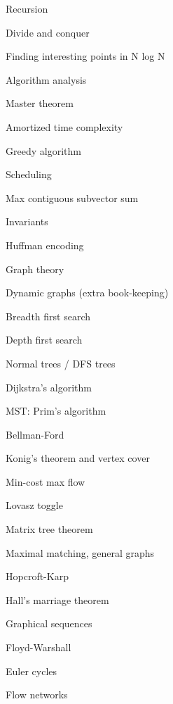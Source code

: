 \begin{myitemize}
\item Recursion
\item Divide and conquer
\begin{myitemize}
	\item Finding interesting points in N log N
\end{myitemize}
\item Algorithm analysis
\begin{myitemize}
	\item Master theorem
	\item Amortized time complexity
\end{myitemize}
\item Greedy algorithm
\begin{myitemize}
	\item Scheduling
	\item Max contiguous subvector sum
	\item Invariants
	\item Huffman encoding
\end{myitemize}
\item Graph theory
\begin{myitemize}
	\item Dynamic graphs (extra book-keeping)
	\item Breadth first search
	\item Depth first search
	\begin{myitemize}
		\item Normal trees / DFS trees
	\end{myitemize}
	\item Dijkstra's algorithm
	\item MST: Prim's algorithm
	\item Bellman-Ford
	\item Konig's theorem and vertex cover
	\item Min-cost max flow
	\item Lovasz toggle
	\item Matrix tree theorem
	\item Maximal matching, general graphs
	\item Hopcroft-Karp
	\item Hall's marriage theorem
	\item Graphical sequences
	\item Floyd-Warshall
	\item Euler cycles
	\item Flow networks
	\begin{myitemize}

\end{myitemize}
\end{myitemize}
\end{myitemize}
